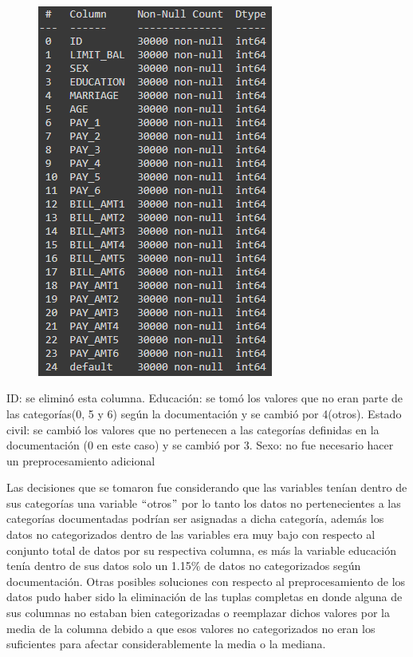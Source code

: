 \documentclass[12pt]{report}
\renewcommand{\_}{\kern-1.5pt\textunderscore\kern-1.5pt}
\begin{document}
\begin{figure}[H]
	\begin{Center}
		\includegraphics[width=3.05in,height=4.82in]{./media/image4.png}
	\end{Center}
\end{figure}




\vspace{\baselineskip}
\vspace{\baselineskip}

\vspace{\baselineskip}
ID: se eliminó esta columna.
Educación: se tomó los valores que no eran parte de las categorías(0, 5 y 6) según la documentación y se cambió por 4(otros).
Estado civil: se cambió los valores que no pertenecen a las categorías definidas en la documentación (0 en este caso) y se cambió por 3. 
Sexo: no fue necesario hacer un preprocesamiento adicional 

\vspace{\baselineskip}
Las decisiones que se tomaron fue considerando que las variables tenían dentro de sus categorías una variable $``$otros$"$  por lo tanto los datos no pertenecientes a las categorías documentadas podrían ser asignadas a dicha categoría, además los datos no categorizados dentro de las variables era muy bajo con respecto al conjunto total de datos por su respectiva columna, es más la variable educación tenía dentro de sus datos solo un 1.15$\%$  de datos no categorizados según documentación.
Otras posibles soluciones con respecto al preprocesamiento de los datos pudo haber sido la eliminación de las tuplas completas en donde alguna de sus columnas no estaban bien categorizadas o reemplazar dichos valores por la media de la columna debido a que esos valores no categorizados no eran los suficientes para afectar considerablemente la media o la mediana.
\end{document}
